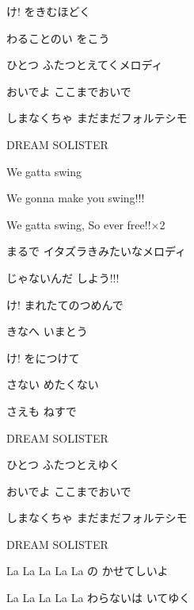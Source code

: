 \documentclass[14pt]{extreport}
\begin{document}
{\item
  け! をきむほどく
  \jisho{}

  わることのい をこう
  \jisho{}

  ひとつ ふたつとえてくメロディ
  \jisho{}

  おいでよ ここまでおいで
  \jisho{}

  しまなくちゃ まだまだフォルテシモ
  \jisho{}

  DREAM SOLISTER
  \jisho{}

\item
  We gatta swing
  \jisho{}

  We gonna make you swing!!!
  \jisho{}

  We gatta swing, So ever free!!×2
  \jisho{}

\item
  まるで イタズラきみたいなメロディ
  \jisho{}

  じゃないんだ しよう!!!
  \jisho{}

\item
  け! まれたてのつめんで
  \jisho{}

  きなへ いまとう
  \jisho{}

  け! をにつけて
  \jisho{}

  さない めたくない
  \jisho{}

  さえも ねすで
  \jisho{}

  DREAM SOLISTER
  \jisho{}

  ひとつ ふたつとえゆく
  \jisho{}

  おいでよ ここまでおいで
  \jisho{}

  しまなくちゃ まだまだフォルテシモ
  \jisho{}

  DREAM SOLISTER
  \jisho{}

\item
  La La La La La の かせてしいよ
  \jisho{}

  La La La La La わらないは いてゆく
  \jisho{}


}
\end{document}
